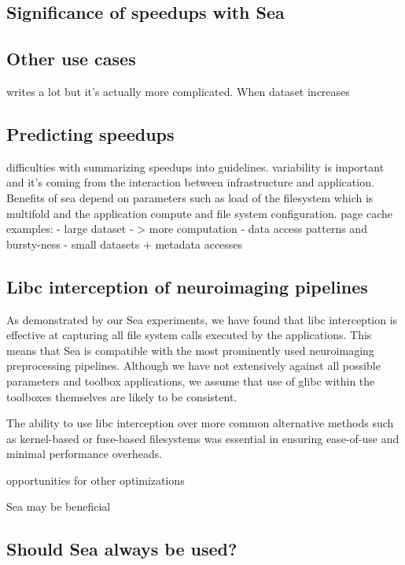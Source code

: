     \subsection{Significance of speedups with Sea}
    
    \subsection{Other use cases}
    writes a lot but it's actually more complicated. When dataset increases
    \subsection{Predicting speedups}
     difficulties with summarizing speedups into guidelines.
     variability is important and it's coming from the interaction between infrastructure and application.
     Benefits of sea depend on parameters such as load of the filesystem which is multifold and the application compute and
     file system configuration. 
     page cache
     examples:
      - large dataset - > more computation
      - data access patterns and bursty-ness
      - small datasets + metadata accesses
    
    \subsection{Libc interception of neuroimaging pipelines}
    
    As demonstrated by our Sea experiments, we have found that libc interception is effective at capturing all file system
    calls executed by the applications. This means that Sea is compatible with the most prominently used neuroimaging
    preprocessing pipelines. Although we have not extensively against all possible parameters and toolbox applications, we
    assume that use of glibc within the toolboxes themselves are likely to be consistent.
    
    The ability to use libc interception over more common alternative methods such as kernel-based or fuse-based filesystems
    was essential in ensuring ease-of-use and minimal performance overheads. 
    
    opportunities for other optimizations
    
    Sea may be beneficial
    \subsection{Should Sea always be used?}
    
